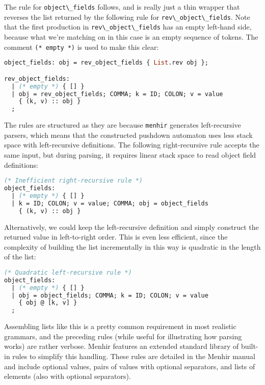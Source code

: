 The rule for \passthrough{\lstinline!object\_fields!} follows, and is
really just a thin wrapper that reverses the list returned by the
following rule for \passthrough{\lstinline!rev\_object\_fields!}. Note
that the first production in
\passthrough{\lstinline!rev\_object\_fields!} has an empty left-hand
side, because what we're matching on in this case is an empty sequence
of tokens. The comment \passthrough{\lstinline!(* empty *)!} is used to
make this clear: 

\begin{lstlisting}[language=Caml]
object_fields: obj = rev_object_fields { List.rev obj };

rev_object_fields:
  | (* empty *) { [] }
  | obj = rev_object_fields; COMMA; k = ID; COLON; v = value
    { (k, v) :: obj }
  ;
\end{lstlisting}

The rules are structured as they are because
\passthrough{\lstinline!menhir!} generates left-recursive parsers, which
means that the constructed pushdown automaton uses less stack space with
left-recursive definitions. The following right-recursive rule accepts
the same input, but during parsing, it requires linear stack space to
read object field definitions: 

\begin{lstlisting}[language=Caml]
(* Inefficient right-recursive rule *)
object_fields:
  | (* empty *) { [] }
  | k = ID; COLON; v = value; COMMA; obj = object_fields
    { (k, v) :: obj }
\end{lstlisting}

Alternatively, we could keep the left-recursive definition and simply
construct the returned value in left-to-right order. This is even less
efficient, since the complexity of building the list incrementally in
this way is quadratic in the length of the list:

\begin{lstlisting}[language=Caml]
(* Quadratic left-recursive rule *)
object_fields:
  | (* empty *) { [] }
  | obj = object_fields; COMMA; k = ID; COLON; v = value
    { obj @ [k, v] }
  ;
\end{lstlisting}

Assembling lists like this is a pretty common requirement in most
realistic grammars, and the preceding rules (while useful for
illustrating how parsing works) are rather verbose. Menhir features an
extended standard library of built-in rules to simplify this handling.
These rules are detailed in the Menhir manual and include optional
values, pairs of values with optional separators, and lists of elements
(also with optional separators). 

